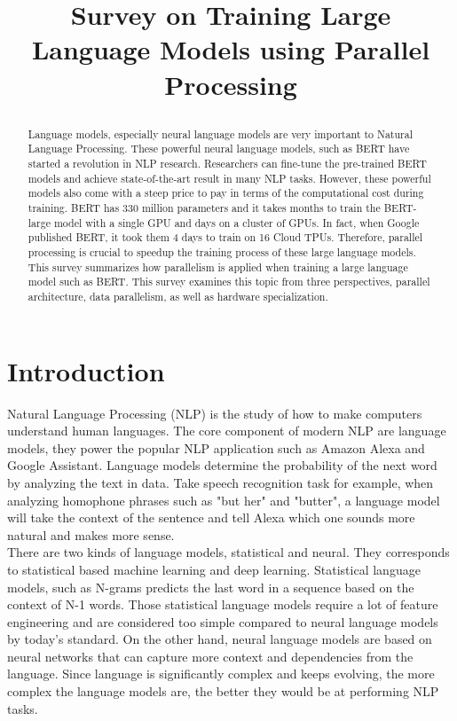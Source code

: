 \documentclass[conference]{IEEEtran}
\begin{document}
\title{Survey on Training Large Language Models using Parallel Processing\\
	\author{
	}
}

\maketitle

\begin{abstract}
Language models, especially neural language models are very important to Natural Language Processing. These powerful neural language models, such as BERT have started a revolution in NLP research. Researchers can fine-tune the pre-trained BERT models and achieve state-of-the-art result in many NLP tasks. However, these powerful models also come with a steep price to pay in terms of the computational cost during training. BERT has 330 million parameters and it takes months to train the BERT-large model with a single GPU and days on a cluster of GPUs. In fact, when Google published BERT, it took them 4 days to train on 16 Cloud TPUs. Therefore, parallel processing is crucial to speedup the training process of these large language models. This survey summarizes how parallelism is applied when training a large language model such as BERT. This survey examines this topic from three perspectives, parallel architecture, data parallelism, as well as hardware specialization.
\end{abstract}

\section{Introduction}
Natural Language Processing (NLP) is the study of how to make computers understand human languages. The core component of modern NLP are language models, they power the popular NLP application such as Amazon Alexa and Google Assistant. Language models determine the probability of the next word by analyzing the text in data. Take speech recognition task for example, when analyzing homophone phrases such as "but her" and "butter", a language model will take the context of the sentence and tell Alexa which one sounds more natural and makes more sense.\\

There are two kinds of language models, statistical and neural. They corresponds to statistical based machine learning and deep learning. Statistical language models, such as N-grams \cite{ngram} predicts the last word in a sequence based on the context of N-1 words. Those statistical language models require a lot of feature engineering and are considered too simple compared to neural language models by today's standard. On the other hand, neural language models are based on neural networks that can capture more context and dependencies from the language. Since language is significantly complex and keeps evolving, the more complex the language models are, the better they would be at performing NLP tasks.\\
\end{document}
